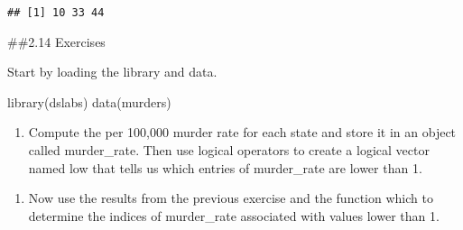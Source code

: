 \documentclass[
]{article}
\newenvironment{Shaded}{\begin{snugshade}}{\end{snugshade}}
\newcommand{\DecValTok}[1]{\textcolor[rgb]{0.00,0.00,0.81}{#1}}
\newcommand{\FunctionTok}[1]{\textcolor[rgb]{0.00,0.00,0.00}{#1}}
\newcommand{\NormalTok}[1]{#1}
\newcommand{\OtherTok}[1]{\textcolor[rgb]{0.56,0.35,0.01}{#1}}
\newcommand{\SpecialCharTok}[1]{\textcolor[rgb]{0.00,0.00,0.00}{#1}}
\newcommand{\StringTok}[1]{\textcolor[rgb]{0.31,0.60,0.02}{#1}}
\providecommand{\tightlist}{%
  \setlength{\itemsep}{0pt}\setlength{\parskip}{0pt}}
\begin{document}
\begin{Shaded}
\end{Shaded}

\begin{verbatim}
## [1] 10 33 44
\end{verbatim}

\#\#2.14 Exercises

Start by loading the library and data.

\begin{Shaded}
\begin{Highlighting}[]
\FunctionTok{library}\NormalTok{(dslabs)}
\FunctionTok{data}\NormalTok{(murders)}
\end{Highlighting}
\end{Shaded}

\begin{enumerate}
\def\labelenumi{\arabic{enumi}.}
\tightlist
\item
  Compute the per 100,000 murder rate for each state and store it in an
  object called murder\_rate. Then use logical operators to create a
  logical vector named low that tells us which entries of murder\_rate
  are lower than 1.
\end{enumerate}

\begin{Shaded}
\end{Shaded}

\begin{enumerate}
\def\labelenumi{\arabic{enumi}.}
\setcounter{enumi}{1}
\tightlist
\item
  Now use the results from the previous exercise and the function which
  to determine the indices of murder\_rate associated with values lower
  than 1.
\end{enumerate}
\end{document}

